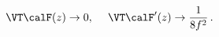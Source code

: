 \begin{equation}
 \VT \calF(z) \to 0, \hspace{3ex}
 \VT \calF'(z) \to \frac{1}{8f^2}\,. \label{region1}
\end{equation}

